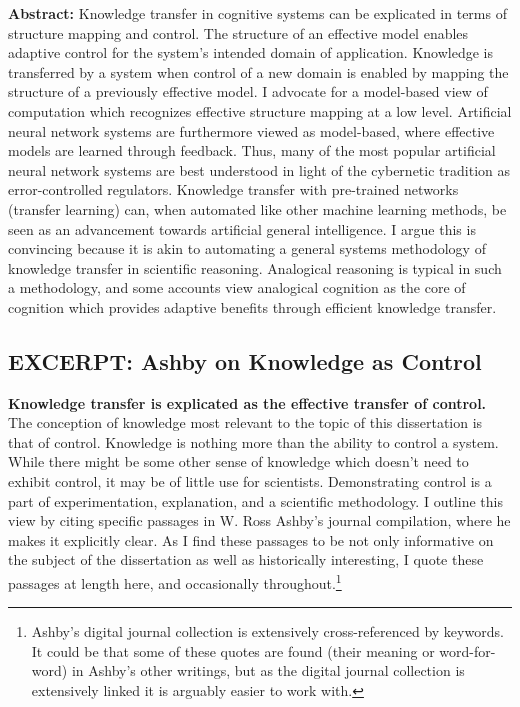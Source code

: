 \documentclass[11pt, oneside]{article}   	%
\begin{document}
\noindent \textbf{Abstract:} Knowledge transfer in cognitive systems can be explicated in terms of structure mapping and control.  The structure of an effective model enables adaptive control for the system's intended domain of application.  Knowledge is transferred by a system when control of a new domain is enabled by mapping the structure of a previously effective model.  I advocate for a model-based view of computation which recognizes effective structure mapping at a low level.  Artificial neural network systems are furthermore viewed as model-based, where effective models are learned through feedback.  Thus, many of the most popular artificial neural network systems are best understood in light of the cybernetic tradition as error-controlled regulators.  Knowledge transfer with pre-trained networks (transfer learning) can, when automated like other machine learning methods, be seen as an advancement towards artificial general intelligence.  I argue this is convincing because it is akin to automating a general systems methodology of knowledge transfer in scientific reasoning.  Analogical reasoning is typical in such a methodology, and some accounts view analogical cognition as the core of cognition which provides adaptive benefits through efficient knowledge transfer.


\subsection{EXCERPT: Ashby on Knowledge as Control}

\noindent \textbf{Knowledge transfer is explicated as the effective transfer of control.}\\

The conception of knowledge most relevant to the topic of this dissertation is that of control.  Knowledge is nothing more than the ability to control a system.  While there might be some other sense of knowledge which doesn't need to exhibit control, it may be of little use for scientists.  Demonstrating control is a part of experimentation, explanation, and a scientific methodology.  I outline this view by citing specific passages in W. Ross Ashby's journal compilation, where he makes it explicitly clear.  As I find these passages to be not only informative on the subject of the dissertation as well as historically interesting, I quote these passages at length here, and occasionally throughout.\footnote{Ashby's digital journal collection is extensively cross-referenced by keywords.  It could be that some of these quotes are found (their meaning or word-for-word) in Ashby's other writings, but as the digital journal collection is extensively linked it is arguably easier to work with.}
\end{document}
